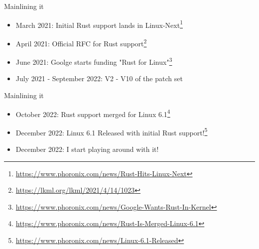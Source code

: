 \begin{frame}[c]{Mainlining it}
  \begin{itemize}
    \item March 2021: Initial Rust support lands in Linux-Next\footnote{\url{https://www.phoronix.com/news/Rust-Hits-Linux-Next}}
    \item April 2021: Official RFC for Rust support\footnote{\url{https://lkml.org/lkml/2021/4/14/1023}}
    \pause \item June 2021: Goolge starts funding "Rust for Linux"\footnote<2->{\url{https://www.phoronix.com/news/Google-Wants-Rust-In-Kernel}}
    \item July 2021 - September 2022: V2 - V10 of the patch set
  \end{itemize}
\end{frame}

\begin{frame}[c]{Mainlining it}
  \begin{itemize}
    \item October 2022: Rust support merged for Linux 6.1\footnote{\url{https://www.phoronix.com/news/Rust-Is-Merged-Linux-6.1}}
    \item December 2022: Linux 6.1 Released with initial Rust support!\footnote{\url{https://www.phoronix.com/news/Linux-6.1-Released}}
    \pause \item December 2022: I start playing around with it!
  \end{itemize}
\end{frame}
